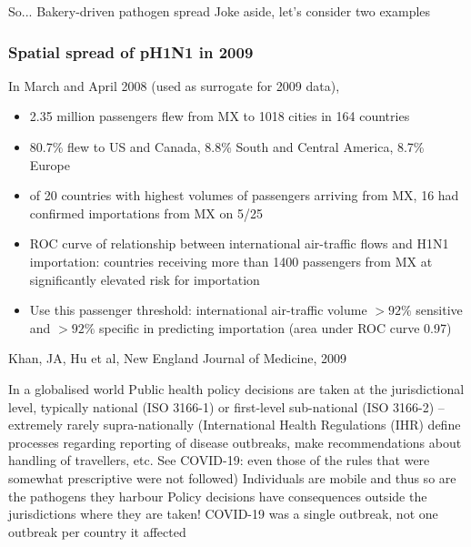 \documentclass[aspectratio=169]{beamer}\usepackage[]{graphicx}\usepackage[]{xcolor}
\begin{document}
\begin{frame}{So...}
\bbullet Bakery-driven pathogen spread
\vfill
\bbullet Joke aside, let's consider two examples
\end{frame}


\begin{frame}
\frametitle{Spatial spread of pH1N1 in 2009}
\nocite{KhanArinoHuRaposoEtAl2009}
	In March and April 2008 (used as surrogate for 2009 data), 
	\begin{itemize}
		\item 2.35 million passengers flew from MX to 1018 cities in 164 countries
		\item 80.7\% flew to US and Canada, 8.8\% South and Central America, 8.7\% Europe
		\item of 20 countries with highest volumes of passengers arriving from MX, 16 had confirmed importations from MX on 5/25
		\item ROC curve of relationship between international air-traffic flows
		and H1N1 importation: countries receiving more than 1400 passengers from MX at significantly elevated risk for importation
		\item Use this passenger threshold: international air-traffic volume 
		$>92\%$ sensitive and $>92\%$ specific in predicting importation (area under ROC curve 0.97)
	\end{itemize}
	\vfill
	\begin{flushright}
		Khan, JA, Hu et al, New England Journal of Medicine, 2009
	\end{flushright}
\end{frame}


\begin{frame}{In a globalised world}
\bbullet
Public health policy decisions are taken at the jurisdictional level, typically national (ISO 3166-1) or first-level sub-national (ISO 3166-2) -- extremely rarely supra-nationally
\vfill
(International Health Regulations (IHR) define processes regarding reporting of disease outbreaks, make recommendations about handling of travellers, etc. See COVID-19: even those of the rules that were somewhat prescriptive were not followed)
\vfill
\bbullet
Individuals are mobile and thus so are the pathogens they harbour
\vfill
\bbullet 
Policy decisions have consequences outside the jurisdictions where they are taken!
\vfill
\bbullet
COVID-19 was a single outbreak, not one outbreak per country it affected
\end{frame}
\end{document}
